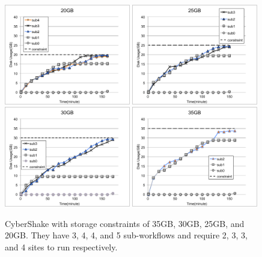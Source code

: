\begin{figure}[h!]
	\centering
    \includegraphics[width=0.49\textwidth]{figures/partitioning/cybershake20gb.pdf}
 \includegraphics[width=0.49\textwidth]{figures/partitioning/cybershake25gb.pdf}
 \includegraphics[width=0.49\textwidth]{figures/partitioning/cybershake30gb.pdf}
 \includegraphics[width=0.49\textwidth]{figures/partitioning/cybershake35gb.pdf}
    \caption{CyberShake with storage constraints of 35GB, 30GB, 25GB, and 20GB. They have 3, 4, 4, and 5 sub-workflows and require 2, 3, 3, and 4 sites to run respectively. }
    \label{fig:constraint}
\end{figure}

